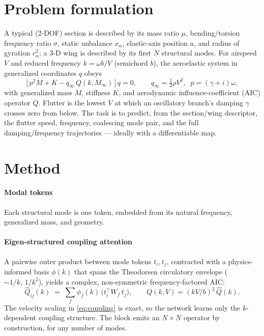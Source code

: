 \documentclass{article}
\begin{document}
\section{Problem formulation}\label{sec:prob}
A typical (2-DOF) section is described by its mass ratio $\mu$, bending/torsion
frequency ratio $\sigma$, static unbalance $x_\alpha$, elastic-axis position $a$,
and radius of gyration $r_\alpha^2$; a 3-D wing is described by its first $N$
structural modes. For airspeed $V$ and reduced frequency $k=\omega b/V$ (semichord
$b$), the aeroelastic system in generalized coordinates $q$ obeys
\begin{equation}
\big[\,p^2 M + K - q_\infty\, Q(k, M_\infty)\,\big]\,q = 0,
\qquad q_\infty = \tfrac12\rho V^2,\;\; p=(\gamma+i)\omega,
\label{eq:flutter}
\end{equation}
with generalized mass $M$, stiffness $K$, and aerodynamic influence-coefficient
(AIC) operator $Q$. Flutter is the lowest $V$ at which an oscillatory branch's
damping $\gamma$ crosses zero from below. The task is to predict, from the
section/wing descriptor, the flutter speed, frequency, coalescing mode pair, and
the full damping/frequency trajectories --- ideally with a differentiable map.

\section{Method}\label{sec:method}
\paragraph{Modal tokens} Each structural mode is one token, embedded from its
natural frequency, generalized mass, and geometry.

\paragraph{Eigen-structured coupling attention} A pairwise outer product between
mode tokens $t_i,t_j$, contracted with a physics-informed basis $\phi(k)$ that
spans the Theodorsen circulatory envelope ($\sim\!1/k,\,1/k^2$), yields a complex,
non-symmetric frequency-factored AIC:
\begin{equation}
\hat{Q}_{ij}(k) \;=\; \sum_{f}\phi_f(k)\,\big(t_i^\top W_f\, t_j\big),
\qquad Q(k,V) = (kV/b)^2\,\hat{Q}(k).
\label{eq:coupling}
\end{equation}
The velocity scaling in \eqref{eq:coupling} is exact, so the network learns only
the $k$-dependent coupling structure. The block emits an $N\times N$ operator by
construction, for any number of modes.
\end{document}
